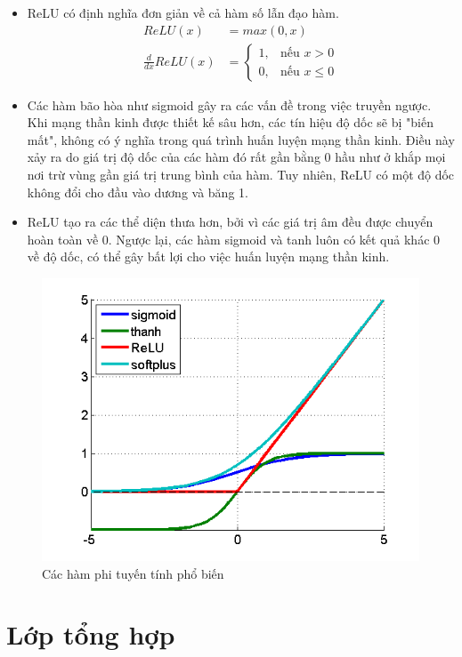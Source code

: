 \documentclass[a4paper]{article}
\begin{document}
\begin{itemize}
    \item ReLU có định nghĩa đơn giản về cả hàm số lẫn đạo hàm.
    \begin{align*}
        ReLU(x) &= max(0, x)\\
        \frac{d}{dx} ReLU(x) &= 
        \begin{cases} 
            1, & \mbox{nếu } x > 0 \\
            0, & \mbox{nếu } x \leq 0
        \end{cases}
    \end{align*}
    \item Các hàm bão hòa như sigmoid gây ra các vấn đề trong việc truyền ngược. Khi mạng thần kinh được thiết kế sâu hơn, các tín hiệu độ dốc sẽ bị "biến mất", không có ý nghĩa trong quá trình huấn luyện mạng thần kinh. Điều này xảy ra do giá trị độ dốc của các hàm đó rất gần bằng 0 hầu như ở khắp mọi nơi trừ vùng gần giá trị trung bình của hàm. Tuy nhiên, ReLU có một độ dốc không đổi cho đầu vào dương và băng 1. 
    \item ReLU tạo ra các thể diện thưa hơn, bởi vì các giá trị âm đều được chuyển hoàn toàn về 0. Ngược lại, các hàm sigmoid và tanh luôn có kết quả khác 0 về độ dốc, có thể gây bất lợi cho việc huấn luyện mạng thần kinh.
\end{itemize}

\begin{figure}
    \centering
    \includegraphics[width=0.6\linewidth]{image/common_nonlinear.png}
	\caption{Các hàm phi tuyến tính phổ biến}
	\label{fig:common_nonlinear}
\end{figure}

\section{Lớp tổng hợp}

\vspace{0.35cm}
\end{document}
